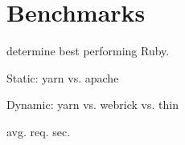 \section{Benchmarks}

determine best performing Ruby.

Static: yarn vs. apache

Dynamic: yarn vs. webrick vs. thin

avg. req. sec.
